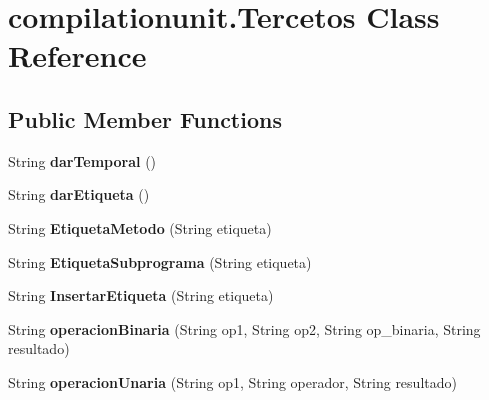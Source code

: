 \hypertarget{classcompilationunit_1_1_tercetos}{
\section{compilationunit.Tercetos Class Reference}
\label{classcompilationunit_1_1_tercetos}
}
\subsection*{Public Member Functions}
\begin{DoxyCompactItemize}
\item 
\hypertarget{classcompilationunit_1_1_tercetos_a7c0052d7e9f94db3f537bfaebfc7f48b}{
String {\bfseries darTemporal} ()}
\label{classcompilationunit_1_1_tercetos_a7c0052d7e9f94db3f537bfaebfc7f48b}

\item 
\hypertarget{classcompilationunit_1_1_tercetos_acaa58f3b5d750d25b12ec994e18b2f07}{
String {\bfseries darEtiqueta} ()}
\label{classcompilationunit_1_1_tercetos_acaa58f3b5d750d25b12ec994e18b2f07}

\item 
\hypertarget{classcompilationunit_1_1_tercetos_af4ae67efa55266981308b0fd49b502cb}{
String {\bfseries EtiquetaMetodo} (String etiqueta)}
\label{classcompilationunit_1_1_tercetos_af4ae67efa55266981308b0fd49b502cb}

\item 
\hypertarget{classcompilationunit_1_1_tercetos_aeb68becb577685422f80e072766570b0}{
String {\bfseries EtiquetaSubprograma} (String etiqueta)}
\label{classcompilationunit_1_1_tercetos_aeb68becb577685422f80e072766570b0}

\item 
\hypertarget{classcompilationunit_1_1_tercetos_abc9d60655331f1347ad9e686e2822afb}{
String {\bfseries InsertarEtiqueta} (String etiqueta)}
\label{classcompilationunit_1_1_tercetos_abc9d60655331f1347ad9e686e2822afb}

\item 
\hypertarget{classcompilationunit_1_1_tercetos_a91ffaf12f421bd45bd7c35e7de44cac8}{
String {\bfseries operacionBinaria} (String op1, String op2, String op\_\-binaria, String resultado)}
\label{classcompilationunit_1_1_tercetos_a91ffaf12f421bd45bd7c35e7de44cac8}

\item 
\hypertarget{classcompilationunit_1_1_tercetos_a823001e4b3c3cce467b36a5443306aa7}{
String {\bfseries operacionUnaria} (String op1, String operador, String resultado)}
\label{classcompilationunit_1_1_tercetos_a823001e4b3c3cce467b36a5443306aa7}


\end{DoxyCompactItemize}
